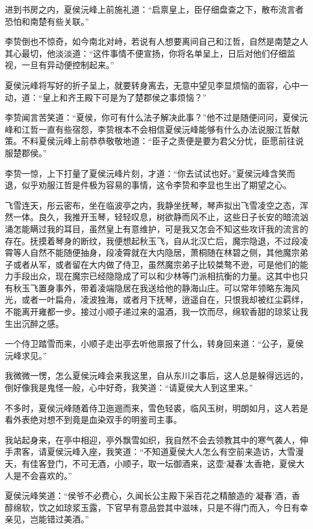 进到书房之内，夏侯沅峰上前施礼道：“启禀皇上，臣仔细盘查之下，散布流言者恐怕和南楚有些关联。”

李贽倒也不惊奇，如今南北对峙，若说有人想要离间自己和江哲，自然是南楚之人其心最切，他淡淡道：“这件事情不便宣扬，你将名单呈上，日后对他们仔细监视，一旦有异动便控制起来。”

夏侯沅峰将写好的折子呈上，就要转身离去，无意中望见李显烦恼的面容，心中一动，道：“皇上和齐王殿下可是为了楚郡侯之事烦恼？”

李贽闻言苦笑道：“夏侯，你可有什么法子解决此事？”他不过是随便问问，夏侯沅峰和江哲一直有些宿怨，李贽根本不会相信夏侯沅峰能够有什么办法说服江哲献策。不料夏侯沅峰上前恭恭敬敬地道：“臣子之责便是要为君父分忧，臣愿前往说服楚郡侯。”

李贽一惊，上下打量了夏侯沅峰片刻，才道：“你去试试也好。”夏侯沅峰含笑而退，似乎劝服江哲是件极为容易的事情，这令李贽和李显也生出了期望之心。

飞雪连天，彤云密布，坐在临波亭之内，我静坐抚琴，琴声拟出飞雪凌空之态，浑然一体。良久，我推开玉琴，轻轻叹息，树欲静而风不止，这些日子长安的暗流汹涌怎能瞒过我的耳目，虽然皇上有意维护，可是我又怎会不知这些攻讦我的流言的存在。抚摸着琴身的断纹，我便想起秋玉飞，自从北汉亡后，魔宗隐退，不过段凌霄等人自然不能随便抽身，段凌霄就在大内隐居，萧桐随在林碧之侧，其他魔宗弟子或者从军，或者留在大内做了侍卫，虽然魔宗弟子比较桀骜不逊，可是他们的能力手段出众，现在魔宗已经隐隐成了可以和少林等门派相抗衡的力量。这其中也只有秋玉飞置身事外，带着凌端隐居在我送给他的静海山庄。可以常年领略东海风光，或者一叶扁舟，凌波独海，或者月下抚琴，逍遥自在，只恨我却被红尘羁绊，不能离开雍都一步。接过小顺子递过来的温酒，我一饮而尽，绵软香甜的琼浆让我生出沉醉之感。

一个侍卫踏雪而来，小顺子走出亭去听他禀报了什么，转身回来道：“公子，夏侯沅峰求见。”

我微微一愣，怎么夏侯沅峰会来我这里，自从东川之事后，这人总是躲得远远的，倒好像我是鬼怪一般，心中好奇，我笑道：“请夏侯大人到这里来。”

不多时，夏侯沅峰随着侍卫迤逦而来，雪色轻裘，临风玉树，明朗如月，这人若是看外表绝对想不到竟是血染双手的明鉴司主事。

我站起身来，在亭中相迎，亭外飘雪如织，我自然不会去领教其中的寒气袭人，伸手肃客，请夏侯沅峰入座，我笑道：“不知道夏侯大人怎么有空前来造访，大雪漫天，有佳客登门，不可无酒，小顺子，取一坛御酒来，这壶‘凝春’太香艳，夏侯大人是不会喜欢的。”

夏侯沅峰笑道：“侯爷不必费心，久闻长公主殿下采百花之精酿造的‘凝春’酒，香醇绵软，饮之如琼浆玉露，下官早有意品尝其中滋味，只是不得门而入，今日有幸亲见，岂能错过美酒。”


